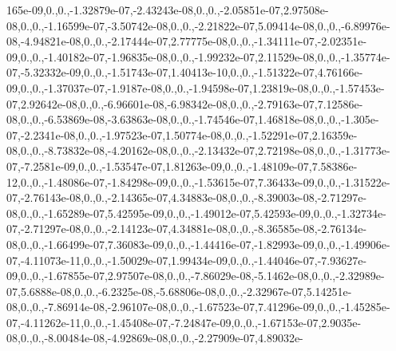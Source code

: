 \begin{DoxyCompactItemize}
165e-\/09,0.,0.,-\/1.\-32879e-\/07,-\/2.\-43243e-\/08,0.,0.,-\/2.\-05851e-\/07,2.\-97508e-\/08,0.,0.,-\/1.\-16599e-\/07,-\/3.\-50742e-\/08,0.,0.,-\/2.\-21822e-\/07,5.\-09414e-\/08,0.,0.,-\/6.\-89976e-\/08,-\/4.\-94821e-\/08,0.,0.,-\/2.\-17444e-\/07,2.\-77775e-\/08,0.,0.,-\/1.\-34111e-\/07,-\/2.\-02351e-\/09,0.,0.,-\/1.\-40182e-\/07,-\/1.\-96835e-\/08,0.,0.,-\/1.\-99232e-\/07,2.\-11529e-\/08,0.,0.,-\/1.\-35774e-\/07,-\/5.\-32332e-\/09,0.,0.,-\/1.\-51743e-\/07,1.\-40413e-\/10,0.,0.,-\/1.\-51322e-\/07,4.\-76166e-\/09,0.,0.,-\/1.\-37037e-\/07,-\/1.\-9187e-\/08,0.,0.,-\/1.\-94598e-\/07,1.\-23819e-\/08,0.,0.,-\/1.\-57453e-\/07,2.\-92642e-\/08,0.,0.,-\/6.\-96601e-\/08,-\/6.\-98342e-\/08,0.,0.,-\/2.\-79163e-\/07,7.\-12586e-\/08,0.,0.,-\/6.\-53869e-\/08,-\/3.\-63863e-\/08,0.,0.,-\/1.\-74546e-\/07,1.\-46818e-\/08,0.,0.,-\/1.\-305e-\/07,-\/2.\-2341e-\/08,0.,0.,-\/1.\-97523e-\/07,1.\-50774e-\/08,0.,0.,-\/1.\-52291e-\/07,2.\-16359e-\/08,0.,0.,-\/8.\-73832e-\/08,-\/4.\-20162e-\/08,0.,0.,-\/2.\-13432e-\/07,2.\-72198e-\/08,0.,0.,-\/1.\-31773e-\/07,-\/7.\-2581e-\/09,0.,0.,-\/1.\-53547e-\/07,1.\-81263e-\/09,0.,0.,-\/1.\-48109e-\/07,7.\-58386e-\/12,0.,0.,-\/1.\-48086e-\/07,-\/1.\-84298e-\/09,0.,0.,-\/1.\-53615e-\/07,7.\-36433e-\/09,0.,0.,-\/1.\-31522e-\/07,-\/2.\-76143e-\/08,0.,0.,-\/2.\-14365e-\/07,4.\-34883e-\/08,0.,0.,-\/8.\-39003e-\/08,-\/2.\-71297e-\/08,0.,0.,-\/1.\-65289e-\/07,5.\-42595e-\/09,0.,0.,-\/1.\-49012e-\/07,5.\-42593e-\/09,0.,0.,-\/1.\-32734e-\/07,-\/2.\-71297e-\/08,0.,0.,-\/2.\-14123e-\/07,4.\-34881e-\/08,0.,0.,-\/8.\-36585e-\/08,-\/2.\-76134e-\/08,0.,0.,-\/1.\-66499e-\/07,7.\-36083e-\/09,0.,0.,-\/1.\-44416e-\/07,-\/1.\-82993e-\/09,0.,0.,-\/1.\-49906e-\/07,-\/4.\-11073e-\/11,0.,0.,-\/1.\-50029e-\/07,1.\-99434e-\/09,0.,0.,-\/1.\-44046e-\/07,-\/7.\-93627e-\/09,0.,0.,-\/1.\-67855e-\/07,2.\-97507e-\/08,0.,0.,-\/7.\-86029e-\/08,-\/5.\-1462e-\/08,0.,0.,-\/2.\-32989e-\/07,5.\-6888e-\/08,0.,0.,-\/6.\-2325e-\/08,-\/5.\-68806e-\/08,0.,0.,-\/2.\-32967e-\/07,5.\-14251e-\/08,0.,0.,-\/7.\-86914e-\/08,-\/2.\-96107e-\/08,0.,0.,-\/1.\-67523e-\/07,7.\-41296e-\/09,0.,0.,-\/1.\-45285e-\/07,-\/4.\-11262e-\/11,0.,0.,-\/1.\-45408e-\/07,-\/7.\-24847e-\/09,0.,0.,-\/1.\-67153e-\/07,2.\-9035e-\/08,0.,0.,-\/8.\-00484e-\/08,-\/4.\-92869e-\/08,0.,0.,-\/2.\-27909e-\/07,4.\-89032e-\/
\end{DoxyCompactItemize}
